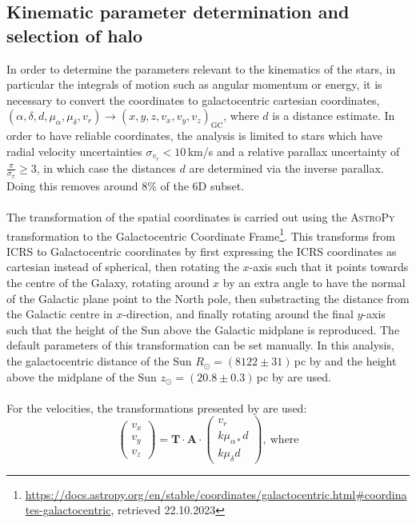 \documentclass[a4paper,11pt]{article}
\begin{document}
\subsection{Kinematic parameter determination and selection of halo}\label{kinparam_halosel}
In order to determine the parameters relevant to the kinematics of the stars, in particular the integrals of motion such as angular momentum or energy, it is necessary to convert the coordinates to galactocentric cartesian coordinates, $(\alpha,\delta,d,\mu_\alpha,\mu_\delta,v_r)\rightarrow(x,y,z,v_x,v_y,v_z)_\mathrm{GC}$, where $d$ is a distance estimate. In order to have reliable coordinates, the analysis is limited to stars which have radial velocity uncertainties $\sigma_{v_r}<10$\,km/s and a relative parallax uncertainty of $\frac{\pi}{\sigma_\pi}\geq3$, in which case the distances $d$ are determined via the inverse parallax. Doing this removes around 8\% of the 6D subset.\\ \\
%
The transformation of the spatial coordinates is carried out using the \textsc{AstroPy} transformation to the Galactocentric Coordinate Frame\footnote{\url{https://docs.astropy.org/en/stable/coordinates/galactocentric.html\#coordinates-galactocentric}, retrieved 22.10.2023}. This transforms from ICRS to Galactocentric coordinates by first expressing the ICRS coordinates as cartesian instead of spherical, then rotating the $x$-axis such that it points towards the centre of the Galaxy, rotating around $x$ by an extra angle to have the normal of the Galactic plane point to the North pole, then substracting the distance from the Galactic centre in $x$-direction, and finally rotating around the final $y$-axis such that the height of the Sun above the Galactic midplane is reproduced. The default parameters of this transformation can be set manually. In this analysis, the galactocentric distance of the Sun $R_\odot=(8122\pm31)$\,pc by \citet{gravity} and the height above the midplane of the Sun $z_\odot=(20.8\pm0.3)$\,pc by \citet{bennett19} are used.\\ \\
%
For the velocities, the transformations presented by \citet{johnson87} are used:
%
\begin{equation}
 \begin{pmatrix}
  v_x \\
  v_y \\
  v_z
 \end{pmatrix}
 = \bm{T}\cdot\bm{A}\cdot
 \begin{pmatrix}
  v_r \\
  k\mu_{\alpha *}d \\
  k\mu_{\delta}d
 \end{pmatrix},\ \text{where}
\end{equation}
\end{document}
